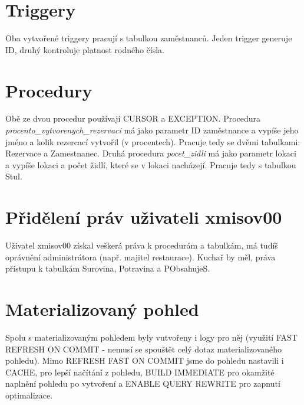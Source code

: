\documentclass[11pt, a4paper]{article}[]
\begin{document}
    \section{Triggery}
    Oba vytvořené triggery pracují s tabulkou zaměstnanců. Jeden trigger generuje
    ID, druhý kontroluje platnost rodného čísla.

    \section{Procedury}
    Obě ze dvou procedur používají CURSOR a EXCEPTION. Procedura  \textit{procento\_vytvorenych\_rezervaci}
    má jako parametr ID zaměstnance a vypíše jeho jméno a kolik rezercací vytvořil
    (v procentech). Pracuje tedy se dvěmi tabulkami: Rezervace a Zamestnanec.
    Druhá procedura \textit{pocet\_zidli} má jako parametr lokaci a vypíše
    lokaci a počet židlí, které se v lokaci nacházejí. Pracuje tedy s tabulkou
    Stul.

    \section{Přidělení práv uživateli xmisov00}
    Uživatel xmisov00 získal veškerá práva k procedurám a tabulkám, má tudíš
    oprávnění administrátora (např. majitel restaurace). Kuchař by měl, práva
    přístupu k tabulkám Surovina, Potravina a PObsahujeS.

    \section{Materializovaný pohled}
    Spolu s materializovaným pohledem byly vutvořeny i logy pro něj (využití
    FAST REFRESH ON COMMIT - nemusí se spouštět celý dotaz materializovaného
    pohledu). Mimo REFRESH FAST ON COMMIT jsme do pohledu nastavili i CACHE,
    pro lepší načítání z pohledu, BUILD IMMEDIATE pro okamžité naplnění pohledu
    po vytvoření a ENABLE QUERY REWRITE pro zapnutí optimalizace.
\end{document}
